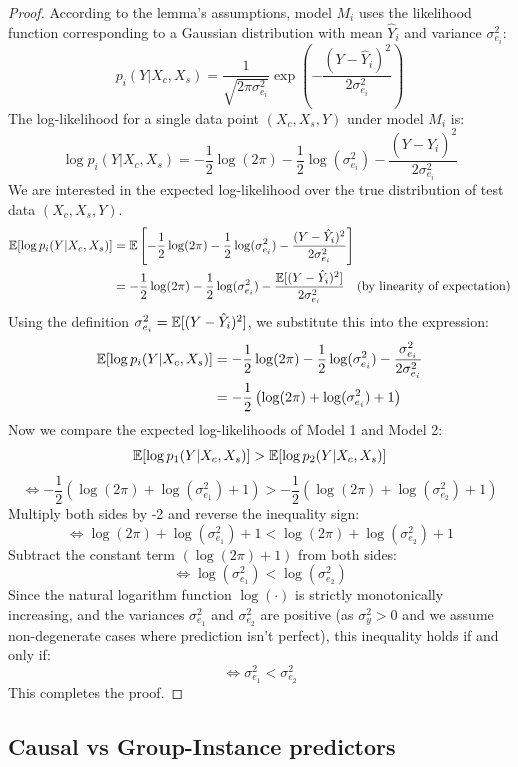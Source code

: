 \documentclass[../thesis.tex]{subfiles}
\begin{document}
\begin{proof}
According to the lemma's assumptions, model $M_i$ uses the likelihood function corresponding to a Gaussian distribution with mean $\hat{Y}_i$ and variance $\sigma^2_{e_i}$:
$$ p_i(Y | X_c, X_s) = \frac{1}{\sqrt{2\pi \sigma^2_{e_i}}} \exp\left( -\frac{(Y - \hat{Y}_i)^2}{2 \sigma^2_{e_i}} \right) $$
The log-likelihood for a single data point $(X_c, X_s, Y)$ under model $M_i$ is:
$$ \log p_i(Y | X_c, X_s) = -\frac{1}{2} \log(2\pi) - \frac{1}{2} \log(\sigma^2_{e_i}) - \frac{(Y - \hat{Y}_i)^2}{2 \sigma^2_{e_i}} $$
We are interested in the expected log-likelihood over the true distribution of test data $(X_c, X_s, Y)$.
\begin{align*}
 \mathbb{E}[\log p_i(Y | X_c, X_s)] &= \mathbb{E} \left[ -\frac{1}{2} \log(2\pi) - \frac{1}{2} \log(\sigma^2_{e_i}) - \frac{(Y - \hat{Y}_i)^2}{2 \sigma^2_{e_i}} \right] \\
 &= -\frac{1}{2} \log(2\pi) - \frac{1}{2} \log(\sigma^2_{e_i}) - \frac{\mathbb{E}[(Y - \hat{Y}_i)^2]}{2 \sigma^2_{e_i}} \quad \text{(by linearity of expectation)}
\end{align*}
Using the definition $\sigma^2_{e_i} = \mathbb{E}[(Y - \hat{Y}_i)^2]$, we substitute this into the expression:
\begin{align*}
 \mathbb{E}[\log p_i(Y | X_c, X_s)] &= -\frac{1}{2} \log(2\pi) - \frac{1}{2} \log(\sigma^2_{e_i}) - \frac{\sigma^2_{e_i}}{2 \sigma^2_{e_i}} \\
 &= -\frac{1}{2} \left( \log(2\pi) + \log(\sigma^2_{e_i}) + 1 \right)
\end{align*}
Now we compare the expected log-likelihoods of Model 1 and Model 2:
$$ \mathbb{E}[\log p_1(Y | X_c, X_s)] > \mathbb{E}[\log p_2(Y | X_c, X_s)] $$
$$ \iff -\frac{1}{2} \left( \log(2\pi) + \log(\sigma^2_{e_1}) + 1 \right) > -\frac{1}{2} \left( \log(2\pi) + \log(\sigma^2_{e_2}) + 1 \right) $$
Multiply both sides by -2 and reverse the inequality sign:
$$ \iff \log(2\pi) + \log(\sigma^2_{e_1}) + 1 < \log(2\pi) + \log(\sigma^2_{e_2}) + 1 $$
Subtract the constant term $(\log(2\pi) + 1)$ from both sides:
$$ \iff \log(\sigma^2_{e_1}) < \log(\sigma^2_{e_2}) $$
Since the natural logarithm function $\log(\cdot)$ is strictly monotonically increasing, and the variances $\sigma^2_{e_1}$ and $\sigma^2_{e_2}$ are positive (as $\sigma_y^2 > 0$ and we assume non-degenerate cases where prediction isn't perfect), this inequality holds if and only if:
$$ \iff \sigma^2_{e_1} < \sigma^2_{e_2} $$
This completes the proof.
\end{proof}

\subsection{Causal vs Group-Instance predictors}
\end{document}
